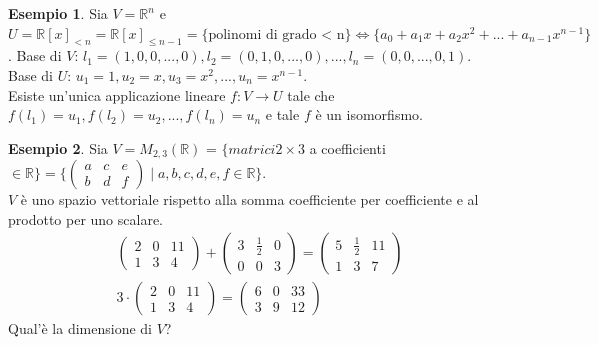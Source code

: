 \documentclass[a4paper]{article}
\theoremstyle{definition}
\newtheorem*{es}{Esempio}
\begin{document}
\begin{es}
	Sia $V = \mathbb{R}^n$ e $U = \mathbb{R}[x]_{<n} = \mathbb{R}[x]_{\leq n - 1} = \{\text{polinomi di grado < n}\} \Leftrightarrow \{a_0 + a_1x + a_2x^2 + ... + a_{n - 1}x^{n - 1}\}$.
	Base di $V$: $l_1 = (1, 0, 0, ..., 0), l_2 = (0, 1, 0, ..., 0), ..., l_n = (0, 0, ..., 0, 1)$. \\
	Base di $U$: $u_1 = 1, u_2 = x, u_3 = x^2, ..., u_n = x^{n - 1}$. \\
	Esiste un'unica applicazione lineare $f: V \rightarrow U$ tale che $f(l_1) = u_1, f(l_2) = u_2, ..., f(l_n) = u_n$ e tale $f$ è un isomorfismo.
\end{es}
\begin{es}
	Sia $V = M_{2, 3}(\mathbb{R})$ = $\{matrici 2 \times 3$ a coefficienti $\in \mathbb{R}\}
		= \{\begin{pmatrix} a & c & e \\ b & d & f \end{pmatrix} \mid a, b, c, d, e, f \in \mathbb{R}\}$. \\
	$V$ è uno spazio vettoriale rispetto alla somma coefficiente per coefficiente e al prodotto per uno scalare. \\
	\begin{align*}
		\begin{pmatrix}
			2 & 0 & 11 \\
			1 & 3 & 4
		\end{pmatrix} + \begin{pmatrix}
			                3 & \frac{1}{2} & 0 \\
			                0 & 0           & 3
		                \end{pmatrix} = \begin{pmatrix}
			                                5 & \frac{1}{2} & 11 \\
			                                1 & 3           & 7
		                                \end{pmatrix} \\
		3 \cdot \begin{pmatrix}
			        2 & 0 & 11 \\
			        1 & 3 & 4
		        \end{pmatrix} = \begin{pmatrix}
			                        6 & 0 & 33 \\
			                        3 & 9 & 12
		                        \end{pmatrix}
	\end{align*}
	Qual'è la dimensione di $V$? \\

\end{es}
\end{document}
